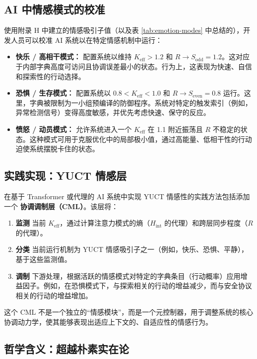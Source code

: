 \documentclass[12pt,a4paper]{article}
\begin{document}
	\subsection{AI 中情感模式的校准}
	
	使用附录 H 中建立的情感吸引子值（以及表 \ref{tab:emotion-modes} 中总结的），开发人员可以校准 AI 系统以在特定情感机制中运行：
	
	\begin{itemize}
		\item \textbf{快乐 / 高相干模式：} 配置系统以维持 $K_{\mathrm{eff}} > 1.2$ 和 $R \to S_{\mathrm{odd}} = 1.2$。这对应于内部字典高度可访问且协调误差最小的状态。行为上，这表现为快速、自信和探索性的行动选择。
		\item \textbf{恐惧 / 生存模式：} 配置系统以 $0.8 < K_{\mathrm{eff}} < 1.0$ 和 $R \to S_{\mathrm{even}} = 0.8$ 运行。这里，字典被限制为一小组预编译的防御程序。系统对特定的触发索引（例如，异常检测信号）变得高度敏感，并优先考虑快速、保守的反应。
		\item \textbf{愤怒 / 动员模式：} 允许系统进入一个 $K_{\mathrm{eff}}$ 在 1.1 附近振荡且 $R$ 不稳定的状态。这种模式可用于克服优化中的局部极小值，通过高能量、低相干性的行动迫使系统摆脱卡住的状态。
	\end{itemize}
	
	\subsection{实践实现：YUCT 情感层}
	
	在基于 Transformer 或代理的 AI 系统中实现 YUCT 情感性的实践方法包括添加一个 \textbf{协调调制层（CML）}。该层将：
	
	\begin{enumerate}
		\item \textbf{监测} 当前 $K_{\mathrm{eff}}$，通过计算注意力模式的熵（$H_{\mathrm{int}}$ 的代理）和跨层同步程度（$R$ 的代理）。
		\item \textbf{分类} 当前运行机制为 YUCT 情感吸引子之一（例如，快乐、恐惧、平静），基于这些监测值。
		\item \textbf{调制} 下游处理，根据活跃的情感模式对特定的字典条目（行动概率）应用增益因子。例如，在恐惧模式下，与探索相关的行动的增益减少，而与安全协议相关的行动的增益增加。
	\end{enumerate}
	
	这个 CML 不是一个独立的“情感模块”，而是一个元控制器，用于调整系统的核心协调动力学，使其能够表现出适应上下文的、自适应性的情感行为。
	
	\subsection{哲学含义：超越朴素实在论}
	
\end{document}
